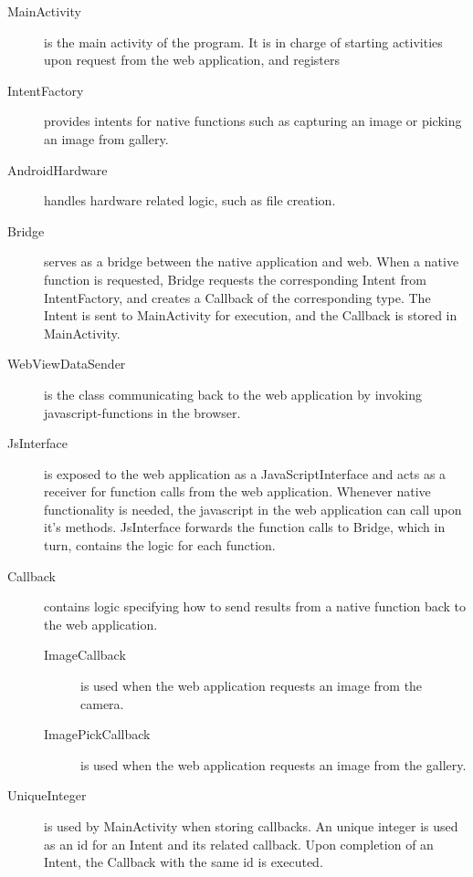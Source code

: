 \begin{description}
	\item[MainActivity] is the main activity of the program. It is in charge of starting activities upon request from the web application, and registers 
	
	
	\item[IntentFactory] provides intents for native functions such as capturing an image or picking an image from gallery. 
	
	\item[AndroidHardware] handles hardware related logic, such as file creation.
	
	\item[Bridge] serves as a bridge between the native application and web. When a native function is requested, Bridge requests the corresponding Intent from IntentFactory, and creates a Callback of the corresponding type. The Intent is sent to MainActivity for execution, and the Callback is stored in MainActivity.
	
	\item[WebViewDataSender] is the class communicating back to the web application by invoking javascript-functions in the browser.
	
	\item[JsInterface] is exposed to the web application as a JavaScriptInterface and acts as a receiver for function calls from the web application. Whenever native functionality is needed, the javascript in the web application can call upon it's methods. JsInterface forwards the function calls to Bridge, which in turn, contains the logic for each function.
	
	\item[Callback] contains logic specifying how to send results from a native function back to the web application.
	
	\begin{description}
		\item[ImageCallback] is used when the web application requests an image from the camera.
		
		\item[ImagePickCallback] is used when the web application requests an image from the gallery.
		
	\end{description}
	\item[UniqueInteger] is used by MainActivity when storing callbacks. An unique integer is used as an id for an Intent and its related callback. Upon completion of an Intent, the Callback with the same id is executed.
	
\end{description}

